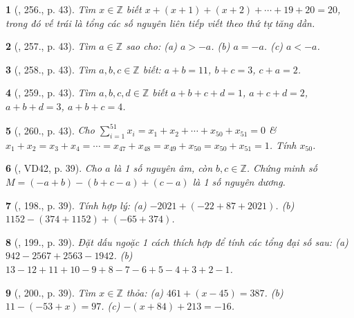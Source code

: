 \documentclass{article}
\newtheorem{baitoan}{}
\begin{document}
\begin{baitoan}[\cite{Binh_Toan_6_tap_1}, 256., p. 43]
	Tìm $x\in\mathbb{Z}$ biết $x + (x + 1) + (x + 2) + \cdots + 19 + 20 = 20$, trong đó vế trái là tổng các số nguyên liên tiếp viết theo thứ tự tăng dần.
\end{baitoan}

\begin{baitoan}[\cite{Binh_Toan_6_tap_1}, 257., p. 43]
	Tìm $a\in\mathbb{Z}$ sao cho: (a) $a > -a$. (b) $a = -a$. (c) $a < -a$.
\end{baitoan}

\begin{baitoan}[\cite{Binh_Toan_6_tap_1}, 258., p. 43]
	Tìm $a,b,c\in\mathbb{Z}$ biết: $a + b = 11$, $b + c = 3$, $c + a = 2$.
\end{baitoan}

\begin{baitoan}[\cite{Binh_Toan_6_tap_1}, 259., p. 43]
	Tìm $a,b,c,d\in\mathbb{Z}$ biết $a + b + c + d = 1$, $a + c + d = 2$, $a + b + d = 3$, $a + b + c = 4$.
\end{baitoan}

\begin{baitoan}[\cite{Binh_Toan_6_tap_1}, 260., p. 43]
	Cho $\sum_{i=1}^{51} x_i = x_1 + x_2 + \cdots + x_{50} + x_{51} = 0$ \& $x_1 + x_2 = x_3 + x_4 = \cdots = x_{47} + x_{48} = x_{49} + x_{50} = x_{50} + x_{51} = 1$. Tính $x_{50}$.
\end{baitoan}

\begin{baitoan}[\cite{Tuyen_Toan_6}, VD42, p. 39]
	Cho $a$ là 1 số nguyên âm, còn $b,c\in\mathbb{Z}$. Chứng minh số $M = (-a + b) - (b + c - a) + (c - a)$ là 1 số nguyên dương.
\end{baitoan}

\begin{baitoan}[\cite{Tuyen_Toan_6}, 198., p. 39]
	Tính hợp lý: (a) $-2021 + (-22 + 87 + 2021)$. (b) $1152 - (374 + 1152) + (-65 + 374)$.
\end{baitoan}

\begin{baitoan}[\cite{Tuyen_Toan_6}, 199., p. 39]
	Đặt dấu ngoặc 1 cách thích hợp để tính các tổng đại số sau: (a) $942 - 2567 + 2563 - 1942$. (b) $13 - 12 + 11 + 10 - 9 + 8 - 7 - 6 + 5 - 4 + 3 + 2 - 1$.
\end{baitoan}

\begin{baitoan}[\cite{Tuyen_Toan_6}, 200., p. 39]
	Tìm $x\in\mathbb{Z}$ thỏa: (a) $461 + (x - 45) = 387$. (b) $11 - (-53 + x) = 97$. (c) $-(x + 84) + 213 = -16$.
\end{baitoan}
\end{document}
